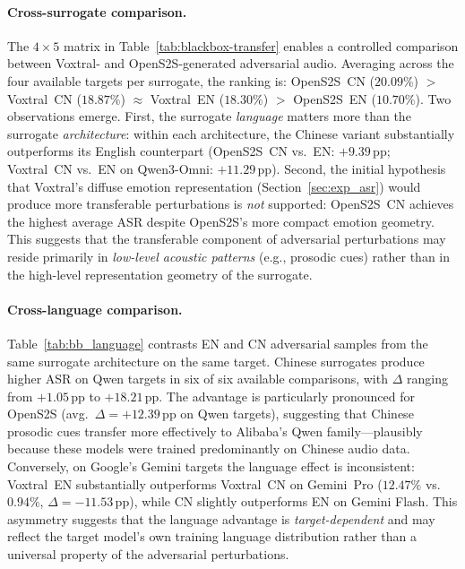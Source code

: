 \paragraph{Cross-surrogate comparison.}
The $4 \times 5$ matrix in Table~\ref{tab:blackbox-transfer} enables a controlled comparison between Voxtral- and OpenS2S-generated adversarial audio.
Averaging across the four available targets per surrogate, the ranking is: OpenS2S~CN ($20.09\%$) $>$ Voxtral~CN ($18.87\%$) $\approx$ Voxtral~EN ($18.30\%$) $>$ OpenS2S~EN ($10.70\%$).
Two observations emerge.
First, the surrogate \emph{language} matters more than the surrogate \emph{architecture}: within each architecture, the Chinese variant substantially outperforms its English counterpart (OpenS2S~CN vs.\ EN: $+9.39$\,pp; Voxtral~CN vs.\ EN on Qwen3-Omni: $+11.29$\,pp).
Second, the initial hypothesis that Voxtral's diffuse emotion representation (Section~\ref{sec:exp_asr}) would produce more transferable perturbations is \emph{not} supported: OpenS2S~CN achieves the highest average ASR despite OpenS2S's more compact emotion geometry.
This suggests that the transferable component of adversarial perturbations may reside primarily in \emph{low-level acoustic patterns} (e.g., prosodic cues) rather than in the high-level representation geometry of the surrogate.

\paragraph{Cross-language comparison.}
Table~\ref{tab:bb_language} contrasts EN and CN adversarial samples from the same surrogate architecture on the same target.
Chinese surrogates produce higher ASR on Qwen targets in six of six available comparisons, with $\Delta$ ranging from $+1.05$\,pp to $+18.21$\,pp.
The advantage is particularly pronounced for OpenS2S (avg.\ $\Delta = +12.39$\,pp on Qwen targets), suggesting that Chinese prosodic cues transfer more effectively to Alibaba's Qwen family---plausibly because these models were trained predominantly on Chinese audio data.
Conversely, on Google's Gemini targets the language effect is inconsistent: Voxtral~EN substantially outperforms Voxtral~CN on Gemini~Pro ($12.47\%$ vs.\ $0.94\%$, $\Delta = -11.53$\,pp), while CN slightly outperforms EN on Gemini Flash.
This asymmetry suggests that the language advantage is \emph{target-dependent} and may reflect the target model's own training language distribution rather than a universal property of the adversarial perturbations.

